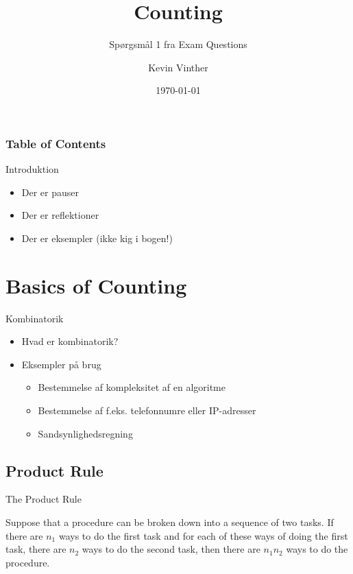\documentclass{beamer}
\title{Counting}
\subtitle{Spørgsmål 1 fra Exam Questions}
\author{Kevin Vinther}
\date{\today}
\begin{document}
\begin{frame}
    \titlepage
\end{frame}

\begin{frame}[allowframebreaks]
    \frametitle{Table of Contents}
    \tableofcontents
\end{frame}

\begin{frame}{Introduktion}
    \begin{itemize}
        \item Der er pauser
        \item Der er reflektioner
        \item Der er eksempler (ikke kig i bogen!)
    \end{itemize}
\end{frame}
\section{Basics of Counting}
\begin{frame}{Kombinatorik}
\begin{itemize}
    \item Hvad er kombinatorik?
    \item Eksempler på brug
    \begin{itemize}
        \item Bestemmelse af kompleksitet af en algoritme
        \item Bestemmelse af f.eks. telefonnumre eller IP-adresser
        \item Sandsynlighedsregning
    \end{itemize}
\end{itemize}
\end{frame}

\subsection{Product Rule}
\begin{frame}{The Product Rule}
   \begin{theorem}
      Suppose that a procedure can be broken down into a sequence of two tasks. If there are $n_1$ ways to do the first task and for each of these ways of doing the first task, there are $n_2$ ways to do the second task, then there are $n_1n_2$ ways to do the procedure.
   \end{theorem} 
\end{frame}
\end{document}
